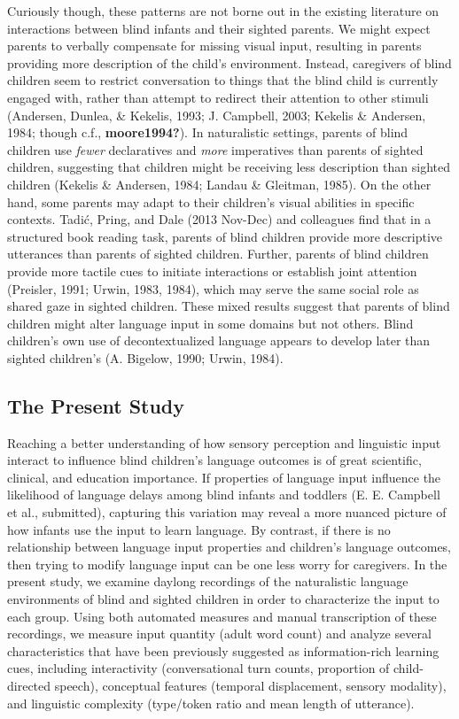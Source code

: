 \documentclass[
  man,floatsintext]{apa6}
\begin{document}
Curiously though, these patterns are not borne out in the existing literature on interactions between blind infants and their sighted parents. We might expect parents to verbally compensate for missing visual input, resulting in parents providing more description of the child's environment. Instead, caregivers of blind children seem to restrict conversation to things that the blind child is currently engaged with, rather than attempt to redirect their attention to other stimuli (Andersen, Dunlea, \& Kekelis, 1993; J. Campbell, 2003; Kekelis \& Andersen, 1984; though c.f., \textbf{moore1994?}). In naturalistic settings, parents of blind children use \emph{fewer} declaratives and \emph{more} imperatives than parents of sighted children, suggesting that children might be receiving less description than sighted children (Kekelis \& Andersen, 1984; Landau \& Gleitman, 1985). On the other hand, some parents may adapt to their children's visual abilities in specific contexts. Tadić, Pring, and Dale (2013 Nov-Dec) and colleagues find that in a structured book reading task, parents of blind children provide more descriptive utterances than parents of sighted children. Further, parents of blind children provide more tactile cues to initiate interactions or establish joint attention (Preisler, 1991; Urwin, 1983, 1984), which may serve the same social role as shared gaze in sighted children. These mixed results suggest that parents of blind children might alter language input in some domains but not others.
Blind children's own use of decontextualized language appears to develop later than sighted children's (A. Bigelow, 1990; Urwin, 1984).

\hypertarget{the-present-study}{%
\subsection{The Present Study}\label{the-present-study}}

Reaching a better understanding of how sensory perception and linguistic input interact to influence blind children's language outcomes is of great scientific, clinical, and education importance. If properties of language input influence the likelihood of language delays among blind infants and toddlers (E. E. Campbell et al., submitted), capturing this variation may reveal a more nuanced picture of how infants use the input to learn language. By contrast, if there is no relationship between language input properties and children's language outcomes, then trying to modify language input can be one less worry for caregivers. In the present study, we examine daylong recordings of the naturalistic language environments of blind and sighted children in order to characterize the input to each group. Using both automated measures and manual transcription of these recordings, we measure input quantity (adult word count) and analyze several characteristics that have been previously suggested as information-rich learning cues, including interactivity (conversational turn counts, proportion of child-directed speech), conceptual features (temporal displacement, sensory modality), and linguistic complexity (type/token ratio and mean length of utterance).
\end{document}
